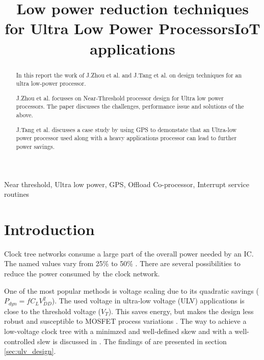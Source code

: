 \documentclass[conference]{IEEEtran}
\begin{document}
\title{Low power reduction techniques for Ultra Low Power ProcessorsIoT applications}

\author{
}

\maketitle

\begin{abstract}
In this report the work of J.Zhou et al. \cite{b1} and J.Tang et al. \cite{b2}
on design techniques for an ultra low-power processor.

J.Zhou et al. focusses on Near-Threshold processor design for Ultra low power
processors. The paper discusses the challenges, performance issue and solutions
of the above.

J.Tang et al. discusses a case study by using GPS to demonstate that an
Ultra-low power processor used along with a heavy applications processor can
lead to further power savings.
\end{abstract}

\begin{IEEEkeywords}
Near threshold, Ultra low power, GPS, Offload Co-processor, Interrupt service
routines
\end{IEEEkeywords}

\section{Introduction} \label{sec:introduction}
Clock tree networks consume a large part of the overall power needed by an IC. The named values vary from 25\% \cite{b4} to 50\% \cite{b5}. There are several possibilities to reduce the power consumed by the clock network.

One of the most popular methods is voltage scaling due to its quadratic savings ($P_{dyn}=fC_LV_{DD}^2$). The used voltage in ultra-low voltage (ULV) applications is close to the threshold voltage ($V_T$). This saves energy, but makes the design less robust and susceptible to MOSFET process variations \cite{b6}.
The way to achieve a low-voltage clock tree with a minimzed and well-defined skew and with a well-controlled slew is discussed in \cite{b1}. The findings of \cite{b1} are presented in section \ref{sec:ulv_design}.  
\end{document}
